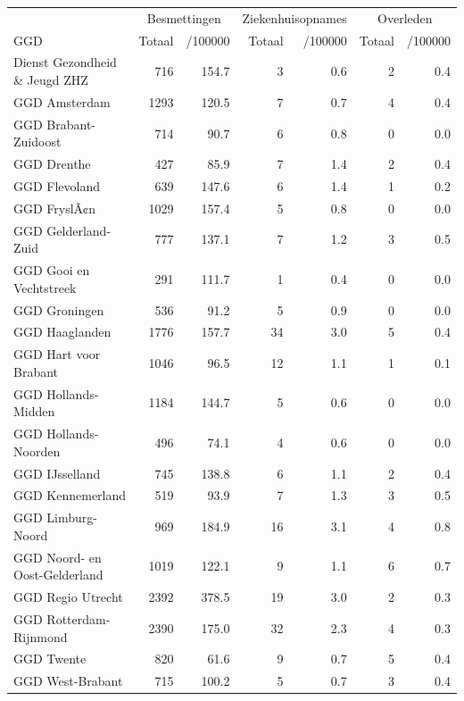 \documentclass[
  english,
  man,floatsintext]{apa6}
\begin{document}
\begin{table}
\centering\begingroup\fontsize{10}{12}\selectfont

\begin{threeparttable}
\begin{tabular}{lrrrrrr}
\toprule
\multicolumn{1}{c}{ } & \multicolumn{2}{c}{Besmettingen} & \multicolumn{2}{c}{Ziekenhuisopnames} & \multicolumn{2}{c}{Overleden} \\
\cmidrule(l{3pt}r{3pt}){2-3} \cmidrule(l{3pt}r{3pt}){4-5} \cmidrule(l{3pt}r{3pt}){6-7}
GGD & Totaal & /100000 & Totaal & /100000 & Totaal & /100000\\
\midrule
Dienst Gezondheid \& Jeugd ZHZ & 716 & 154.7 & 3 & 0.6 & 2 & 0.4\\
GGD Amsterdam & 1293 & 120.5 & 7 & 0.7 & 4 & 0.4\\
GGD Brabant-Zuidoost & 714 & 90.7 & 6 & 0.8 & 0 & 0.0\\
GGD Drenthe & 427 & 85.9 & 7 & 1.4 & 2 & 0.4\\
GGD Flevoland & 639 & 147.6 & 6 & 1.4 & 1 & 0.2\\
GGD FryslÃ¢n & 1029 & 157.4 & 5 & 0.8 & 0 & 0.0\\
GGD Gelderland-Zuid & 777 & 137.1 & 7 & 1.2 & 3 & 0.5\\
GGD Gooi en Vechtstreek & 291 & 111.7 & 1 & 0.4 & 0 & 0.0\\
GGD Groningen & 536 & 91.2 & 5 & 0.9 & 0 & 0.0\\
GGD Haaglanden & 1776 & 157.7 & 34 & 3.0 & 5 & 0.4\\
GGD Hart voor Brabant & 1046 & 96.5 & 12 & 1.1 & 1 & 0.1\\
GGD Hollands-Midden & 1184 & 144.7 & 5 & 0.6 & 0 & 0.0\\
GGD Hollands-Noorden & 496 & 74.1 & 4 & 0.6 & 0 & 0.0\\
GGD IJsselland & 745 & 138.8 & 6 & 1.1 & 2 & 0.4\\
GGD Kennemerland & 519 & 93.9 & 7 & 1.3 & 3 & 0.5\\
GGD Limburg-Noord & 969 & 184.9 & 16 & 3.1 & 4 & 0.8\\
GGD Noord- en Oost-Gelderland & 1019 & 122.1 & 9 & 1.1 & 6 & 0.7\\
GGD Regio Utrecht & 2392 & 378.5 & 19 & 3.0 & 2 & 0.3\\
GGD Rotterdam-Rijnmond & 2390 & 175.0 & 32 & 2.3 & 4 & 0.3\\
GGD Twente & 820 & 61.6 & 9 & 0.7 & 5 & 0.4\\
GGD West-Brabant & 715 & 100.2 & 5 & 0.7 & 3 & 0.4\\

\end{tabular}
\end{threeparttable}
\end{table}
\end{document}
